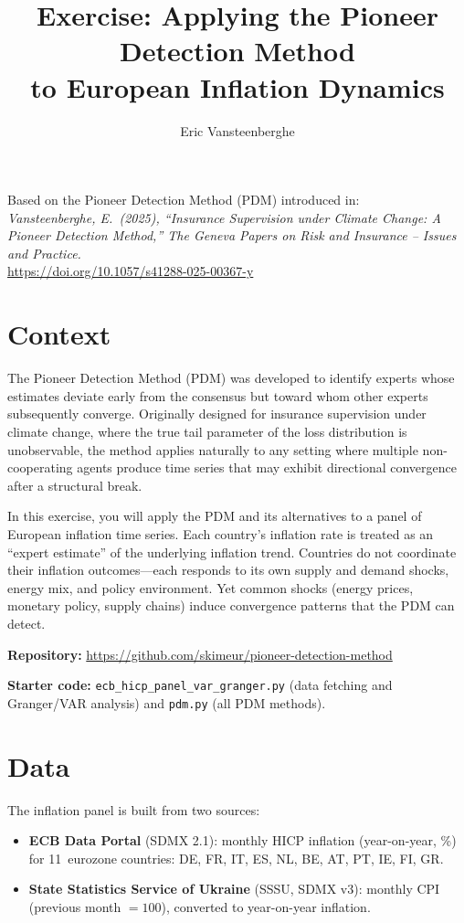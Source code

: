 \documentclass[11pt,a4paper]{article}
\title{\textbf{Exercise: Applying the Pioneer Detection Method\\ to European Inflation Dynamics}}
\author{Eric Vansteenberghe}
\date{}
\begin{document}
\maketitle

Based on the Pioneer Detection Method (PDM) introduced in:\medskip\\
\textit{Vansteenberghe, E.\ (2025), ``Insurance Supervision under Climate Change:
A Pioneer Detection Method,''
The Geneva Papers on Risk and Insurance -- Issues and Practice.}\\[4pt]
\url{https://doi.org/10.1057/s41288-025-00367-y}

\section*{Context}

The Pioneer Detection Method (PDM) was developed to identify experts whose estimates deviate early from the consensus but toward whom other experts subsequently converge. Originally designed for insurance supervision under climate change, where the true tail parameter of the loss distribution is unobservable, the method applies naturally to any setting where multiple non-cooperating agents produce time series that may exhibit directional convergence after a structural break.

In this exercise, you will apply the PDM and its alternatives to a panel of European inflation time series. Each country's inflation rate is treated as an ``expert estimate'' of the underlying inflation trend. Countries do not coordinate their inflation outcomes---each responds to its own supply and demand shocks, energy mix, and policy environment. Yet common shocks (energy prices, monetary policy, supply chains) induce convergence patterns that the PDM can detect.

\medskip

\noindent\textbf{Repository:} \url{https://github.com/skimeur/pioneer-detection-method}

\noindent\textbf{Starter code:} \texttt{ecb\_hicp\_panel\_var\_granger.py} (data fetching and Granger/VAR analysis) and \texttt{pdm.py} (all PDM methods).

\section*{Data}

The inflation panel is built from two sources:
\begin{itemize}[nosep]
    \item \textbf{ECB Data Portal} (SDMX 2.1): monthly HICP inflation (year-on-year, \%) for 11~eurozone countries: DE, FR, IT, ES, NL, BE, AT, PT, IE, FI, GR.
    \item \textbf{State Statistics Service of Ukraine} (SSSU, SDMX v3): monthly CPI (previous month $= 100$), converted to year-on-year inflation.
\end{itemize}
\end{document}
